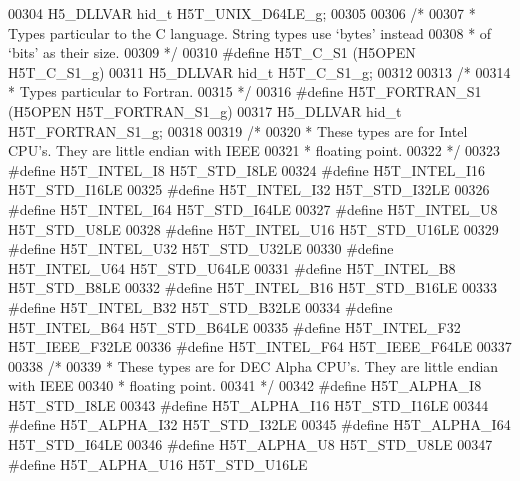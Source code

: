 \begin{DoxyCode}
00304 H5\_DLLVAR hid\_t H5T\_UNIX\_D64LE\_g;
00305 
00306 \textcolor{comment}{/*}
00307 \textcolor{comment}{ * Types particular to the C language.  String types use `bytes' instead}
00308 \textcolor{comment}{ * of `bits' as their size.}
00309 \textcolor{comment}{ */}
00310 \textcolor{preprocessor}{#define H5T\_C\_S1        (H5OPEN H5T\_C\_S1\_g)}
00311 H5\_DLLVAR hid\_t H5T\_C\_S1\_g;
00312 
00313 \textcolor{comment}{/*}
00314 \textcolor{comment}{ * Types particular to Fortran.}
00315 \textcolor{comment}{ */}
00316 \textcolor{preprocessor}{#define H5T\_FORTRAN\_S1      (H5OPEN H5T\_FORTRAN\_S1\_g)}
00317 H5\_DLLVAR hid\_t H5T\_FORTRAN\_S1\_g;
00318 
00319 \textcolor{comment}{/*}
00320 \textcolor{comment}{ * These types are for Intel CPU's.  They are little endian with IEEE}
00321 \textcolor{comment}{ * floating point.}
00322 \textcolor{comment}{ */}
00323 \textcolor{preprocessor}{#define H5T\_INTEL\_I8        H5T\_STD\_I8LE}
00324 \textcolor{preprocessor}{#define H5T\_INTEL\_I16       H5T\_STD\_I16LE}
00325 \textcolor{preprocessor}{#define H5T\_INTEL\_I32       H5T\_STD\_I32LE}
00326 \textcolor{preprocessor}{#define H5T\_INTEL\_I64       H5T\_STD\_I64LE}
00327 \textcolor{preprocessor}{#define H5T\_INTEL\_U8        H5T\_STD\_U8LE}
00328 \textcolor{preprocessor}{#define H5T\_INTEL\_U16       H5T\_STD\_U16LE}
00329 \textcolor{preprocessor}{#define H5T\_INTEL\_U32       H5T\_STD\_U32LE}
00330 \textcolor{preprocessor}{#define H5T\_INTEL\_U64       H5T\_STD\_U64LE}
00331 \textcolor{preprocessor}{#define H5T\_INTEL\_B8        H5T\_STD\_B8LE}
00332 \textcolor{preprocessor}{#define H5T\_INTEL\_B16       H5T\_STD\_B16LE}
00333 \textcolor{preprocessor}{#define H5T\_INTEL\_B32       H5T\_STD\_B32LE}
00334 \textcolor{preprocessor}{#define H5T\_INTEL\_B64       H5T\_STD\_B64LE}
00335 \textcolor{preprocessor}{#define H5T\_INTEL\_F32       H5T\_IEEE\_F32LE}
00336 \textcolor{preprocessor}{#define H5T\_INTEL\_F64       H5T\_IEEE\_F64LE}
00337 
00338 \textcolor{comment}{/*}
00339 \textcolor{comment}{ * These types are for DEC Alpha CPU's.  They are little endian with IEEE}
00340 \textcolor{comment}{ * floating point.}
00341 \textcolor{comment}{ */}
00342 \textcolor{preprocessor}{#define H5T\_ALPHA\_I8        H5T\_STD\_I8LE}
00343 \textcolor{preprocessor}{#define H5T\_ALPHA\_I16       H5T\_STD\_I16LE}
00344 \textcolor{preprocessor}{#define H5T\_ALPHA\_I32       H5T\_STD\_I32LE}
00345 \textcolor{preprocessor}{#define H5T\_ALPHA\_I64       H5T\_STD\_I64LE}
00346 \textcolor{preprocessor}{#define H5T\_ALPHA\_U8        H5T\_STD\_U8LE}
00347 \textcolor{preprocessor}{#define H5T\_ALPHA\_U16       H5T\_STD\_U16LE}

\end{DoxyCode}
